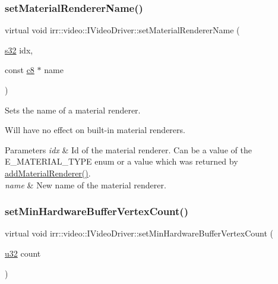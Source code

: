 \subsubsection{\texorpdfstring{set\+Material\+Renderer\+Name()}{setMaterialRendererName()}}
{\footnotesize\ttfamily virtual void irr\+::video\+::\+I\+Video\+Driver\+::set\+Material\+Renderer\+Name (\begin{DoxyParamCaption}\item[{\hyperlink{namespaceirr_ac66849b7a6ed16e30ebede579f9b47c6}{s32}}]{idx,  }\item[{const \hyperlink{namespaceirr_a9395eaea339bcb546b319e9c96bf7410}{c8} $\ast$}]{name }\end{DoxyParamCaption})\hspace{0.3cm}{\ttfamily [pure virtual]}}



Sets the name of a material renderer. 

Will have no effect on built-\/in material renderers. 
\begin{DoxyParams}{Parameters}
{\em idx} & Id of the material renderer. Can be a value of the E\+\_\+\+M\+A\+T\+E\+R\+I\+A\+L\+\_\+\+T\+Y\+PE enum or a value which was returned by \hyperlink{classirr_1_1video_1_1IVideoDriver_a0dfc3a7168f3a73a6f4323b579f03ff6}{add\+Material\+Renderer()}. \\
\hline
{\em name} & New name of the material renderer. \\
\hline
\end{DoxyParams}
\mbox{\label{classirr_1_1video_1_1IVideoDriver_a79cbd1329b4206503e9a9593592502ea}} 
\subsubsection{\texorpdfstring{set\+Min\+Hardware\+Buffer\+Vertex\+Count()}{setMinHardwareBufferVertexCount()}}
{\footnotesize\ttfamily virtual void irr\+::video\+::\+I\+Video\+Driver\+::set\+Min\+Hardware\+Buffer\+Vertex\+Count (\begin{DoxyParamCaption}\item[{\hyperlink{namespaceirr_a0416a53257075833e7002efd0a18e804}{u32}}]{count }\end{DoxyParamCaption})\hspace{0.3cm}{\ttfamily [pure virtual]}}



